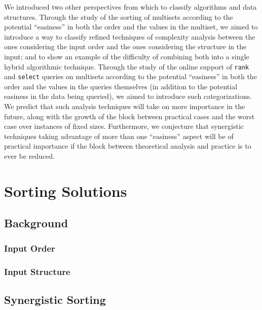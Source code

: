   We introduced two other perspectives from which to classify
  algorithms and data structures.
%
  Through the study of the sorting of multisets according to the
  potential ``easiness'' in both the order and the values in the
  multiset, we aimed to introduce a way to classify refined techniques
  of complexity analysis between the ones considering the input order
  and the ones considering the structure in the input; and to show an
  example of the difficulty of combining both into a single hybrid
  algorithmic technique.
%
  Through the study of the online support of \texttt{rank} and
  \texttt{select} queries on multisets according to the potential
  ``easiness'' in both the order and the values in the queries
  themselves (in addition to the potential easiness in the data being
  queried), we aimed to introduce
% 
%
  such categorizations. We predict that such analysis techniques will
  take on more importance in the future, along with the growth of the
  block between practical cases and the worst case over instances of
  fixed sizes. Furthermore, we conjecture that synergistic techniques
  taking advantage of more than one ``easiness'' aspect will be of
  practical importance if the block between theoretical analysis and
  practice is to ever be reduced.

\section{Sorting Solutions}
\label{sec:sort}

\subsection{Background}
\label{sec:back}

\subsubsection{Input Order}
\label{sec:order}

\subsubsection{Input Structure}
\label{sec:structure}

\subsection{Synergistic Sorting}
\label{sec:syn-sort}

